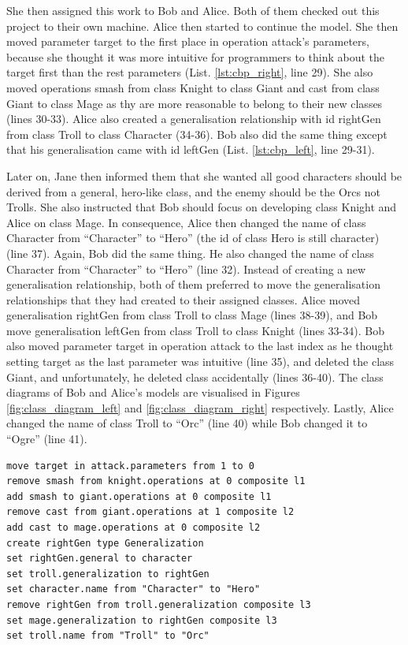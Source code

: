 She then assigned this work to Bob and Alice. Both of them checked out this project to their own machine. Alice then started to continue the model. She then moved parameter \textsf{target} to the first place in operation \textsf{attack}'s parameters, because she thought it was more intuitive for programmers to think about the \textsf{target} first than the rest parameters (List. \ref{lst:cbp_right}, line 29). She also moved operations \textsf{smash} from class \textsf{Knight} to class \textsf{Giant} and \textsf{cast} from class \textsf{Giant} to class \textsf{Mage} as thy are more reasonable to belong to their new classes (lines 30-33). Alice also created a generalisation relationship with id \textsf{rightGen} from class \textsf{Troll} to class \textsf{Character} (34-36). Bob also did the same thing except that his generalisation came with id \textsf{leftGen} (List. \ref{lst:cbp_left}, line 29-31). 

Later on, Jane then informed them that she wanted all good characters should be derived from a general, hero-like class, and the enemy should be the Orcs not Trolls. She also instructed that Bob should focus on developing class \textsf{Knight} and Alice on class \textsf{Mage}. In consequence, Alice then changed the name of class \textsf{Character} from ``Character'' to ``Hero'' (the id of class \textsf{Hero} is still \textsf{character}) (line 37). Again, Bob did the same thing. He also changed the name of class \textsf{Character} from ``Character'' to ``Hero'' (line 32). Instead of creating a new generalisation relationship, both of them preferred to move the generalisation relationships that they had created to their assigned classes. Alice moved generalisation \textsf{rightGen} from class \textsf{Troll} to class \textsf{Mage} (lines 38-39), and Bob move generalisation \textsf{leftGen} from class \textsf{Troll} to class \textsf{Knight} (lines 33-34). Bob also moved parameter \textsf{target} in operation \textsf{attack} to the last index as he thought setting target as the last parameter was intuitive (line 35), and deleted the class {Giant}, and unfortunately, he deleted class  accidentally (lines 36-40). The class diagrams of Bob and Alice's models are visualised in Figures \ref{fig:class_diagram_left} and \ref{fig:class_diagram_right} respectively. Lastly, Alice changed the \textsf{name} of class \textsf{Troll} to ``Orc'' (line 40) while Bob changed it to ``Ogre'' (line 41).  

\begin{lstlisting}[firstnumber=29,style=eol,caption={The appended events made by Alice to produce the right model in Fig. \ref{fig:class_diagram_right} (right version).},label=lst:cbp_right]
move target in attack.parameters from 1 to 0
remove smash from knight.operations at 0 composite l1
add smash to giant.operations at 0 composite l1
remove cast from giant.operations at 1 composite l2
add cast to mage.operations at 0 composite l2
create rightGen type Generalization
set rightGen.general to character
set troll.generalization to rightGen
set character.name from "Character" to "Hero"
remove rightGen from troll.generalization composite l3
set mage.generalization to rightGen composite l3
set troll.name from "Troll" to "Orc"
\end{lstlisting}

